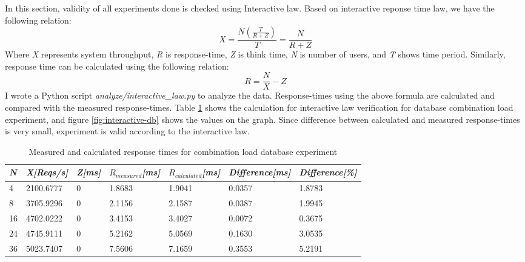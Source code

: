 \documentclass[11pt]{article}
\begin{document}
In this section, validity of all experiments done is checked using Interactive law. 
Based on interactive reponse time law, we have the following relation:
\begin{equation}
X=\frac{N(\frac{T}{R+Z})}{T}=\frac{N}{R+Z}  
\end{equation} Where \emph{X} represents system throughput, \emph{R} is response-time,
\emph{Z} is think time, \textit{N} is number of users, and \emph{T} shows time period.
Similarly, response time can be calculated using the following relation:
\begin{equation}
R=\frac{N}{X}-Z
\end{equation} I wrote a Python script \emph{analyze/interactive\_law.py} to analyze the data. Response-times 
using the above formula are calculated and compared with the measured response-times. Table \ref{tbl:interactive-db} shows the calculation for 
interactive law verification for database combination load experiment, and 
figure \ref{fig:interactive-db} shows the values on the graph. Since difference between calculated and 
measured response-times is very small, experiment is valid according to the interactive law.


\begin{table}[!ht]
  \begin{tabular}{*7l}    \toprule
    \emph{N}   & \emph{X[Reqs/s]} & \emph{Z[ms]} & \emph{$R_{measured}$[ms]} & \emph{$R_{calculated}$[ms]} &   \emph{Difference[ms]} & \emph{Difference[\%]} \\\midrule

    4 &      2100.6777 &          0 &    1.8683 &    1.9041 &       0.0357  &  1.8783 \\
    8 &      3705.9296 &          0 &    2.1156 &    2.1587 &       0.0387  &  1.9945 \\
    16 &     4702.0222 &          0 &    3.4153 &    3.4027 &       0.0072  &  0.3675 \\
    24 &     4745.9111 &          0 &    5.2162 &    5.0569 &       0.1630  &  3.0535 \\
    36 &     5023.7407 &          0 &    7.5606 &    7.1659 &       0.3553  &  5.2191 \\
    \hline
  \end{tabular}
  \centering
  \caption{Measured and calculated response times for combination load database experiment}
  \label{tbl:interactive-db}
\end{table}
\end{document}
